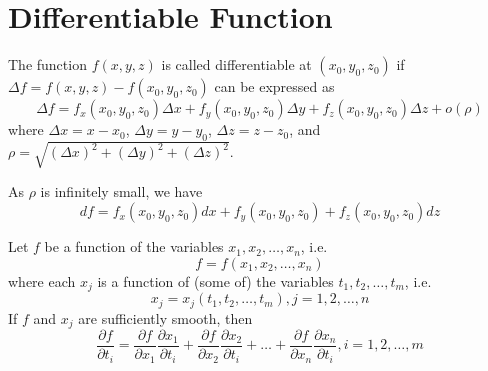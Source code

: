\section{Differentiable Function}
\begin{mydef}
\normalfont The function \(f(x, y, z)\) is called differentiable at \((x_0, y_0, z_0)\) if \(\Delta f = f(x, y, z) - f(x_0, y_0, z_0)\) can be expressed as
%
\[\Delta f = f_x(x_0,y_0,z_0)\Delta x + f_y(x_0,y_0,z_0)\Delta y + f_z(x_0,y_0,z_0)\Delta z + o(\rho)\]
%
where \(\Delta x = x - x_0\), \(\Delta y = y - y_0\), \(\Delta z = z - z_0\), and \(\rho = \sqrt{(\Delta x)^2 + (\Delta y)^2 + (\Delta z)^2}\).

As \(\rho\) is infinitely small, we have
\[df = f_x(x_0,y_0,z_0)dx + f_y(x_0,y_0,z_0) + f_z(x_0,y_0,z_0)dz\]
\end{mydef}

\begin{mydef}
\normalfont Let \(f\) be a function of the variables \(x_1, x_2, \hdots, x_n\), i.e. 
%
\[f = f(x_1, x_2, \hdots, x_n)\]
%
where each \(x_j\) is a function of (some of) the variables \(t_1, t_2, \hdots, t_m\), i.e. 
%
\[x_j = x_j(t_1, t_2, \hdots, t_m), j = 1, 2, \hdots, n\]
%
If \(f\) and \(x_j\) are sufficiently smooth, then
%
\[\frac{\partial f}{\partial t_i} = \frac{\partial f}{\partial x_1}\frac{\partial x_1}{\partial t_i} + \frac{\partial f}{\partial x_2}\frac{\partial x_2}{\partial t_i} + \hdots + \frac{\partial f}{\partial x_n}\frac{\partial x_n}{\partial t_i}, i = 1,2,\hdots, m\]
%
\end{mydef}





























